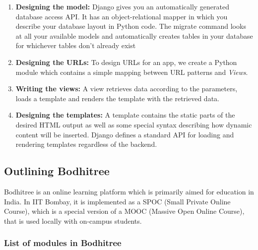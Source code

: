 \begin{enumerate}
	
	\item \textbf{Designing the model:} Django gives you an automatically generated database access API. It has an object-relational mapper in which you describe your database layout in Python code. The migrate command looks at all your available models and automatically creates tables in your database for whichever tables don’t already exist

	\item \textbf{Designing the URLs:} To design URLs for an app, we create a Python module which contains a simple mapping between URL patterns and \emph{Views}.
	
	\item \textbf{Writing the views:} A view retrieves data according to the parameters, loads a template and renders the template with the retrieved data.
	
	\item \textbf{Designing the templates:} A template contains the static parts of the desired HTML output as well as some special syntax describing how dynamic content will be inserted. Django defines a standard API for loading and rendering templates regardless of the backend.

\end{enumerate}

\subsection{Outlining Bodhitree}
\hspace{0.35cm} Bodhitree is an online learning platform which is primarily aimed for education in India. In IIT Bombay, it is implemented as a SPOC (Small Private Online Course), which is a special version of a MOOC (Massive Open Online Course), that is used locally with on-campus students.

\subsubsection*{List of modules in Bodhitree}

